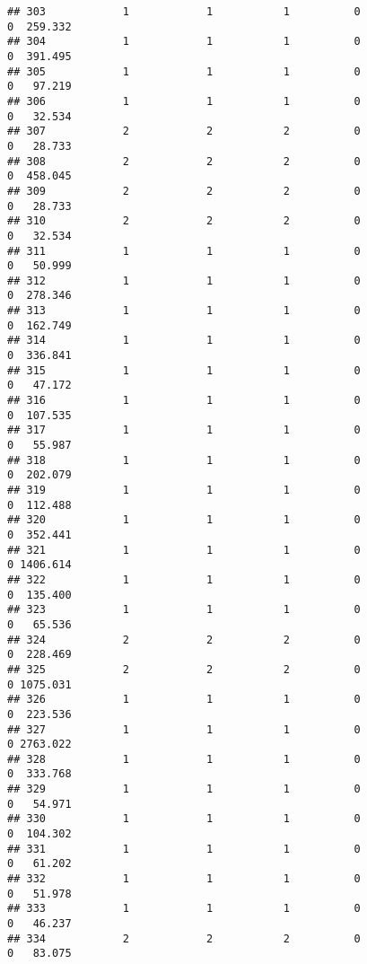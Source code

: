 \documentclass[
]{article}
\begin{document}
\begin{verbatim}
## 303            1            1           1          0                0  259.332
## 304            1            1           1          0                0  391.495
## 305            1            1           1          0                0   97.219
## 306            1            1           1          0                0   32.534
## 307            2            2           2          0                0   28.733
## 308            2            2           2          0                0  458.045
## 309            2            2           2          0                0   28.733
## 310            2            2           2          0                0   32.534
## 311            1            1           1          0                0   50.999
## 312            1            1           1          0                0  278.346
## 313            1            1           1          0                0  162.749
## 314            1            1           1          0                0  336.841
## 315            1            1           1          0                0   47.172
## 316            1            1           1          0                0  107.535
## 317            1            1           1          0                0   55.987
## 318            1            1           1          0                0  202.079
## 319            1            1           1          0                0  112.488
## 320            1            1           1          0                0  352.441
## 321            1            1           1          0                0 1406.614
## 322            1            1           1          0                0  135.400
## 323            1            1           1          0                0   65.536
## 324            2            2           2          0                0  228.469
## 325            2            2           2          0                0 1075.031
## 326            1            1           1          0                0  223.536
## 327            1            1           1          0                0 2763.022
## 328            1            1           1          0                0  333.768
## 329            1            1           1          0                0   54.971
## 330            1            1           1          0                0  104.302
## 331            1            1           1          0                0   61.202
## 332            1            1           1          0                0   51.978
## 333            1            1           1          0                0   46.237
## 334            2            2           2          0                0   83.075

\end{verbatim}
\end{document}
